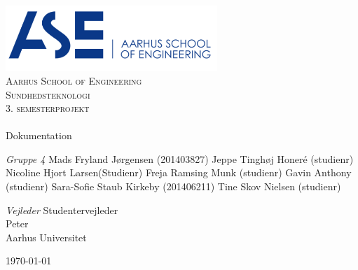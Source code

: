 \begin{titlingpage}
\begin{center}

~ \\[3cm]

\includegraphics[width=0.6\textwidth]{figurer/ASE}~\\[1cm]

\textsc{\LARGE Aarhus School of Engineering}\\[1.5cm]

\textsc{\Large Sundhedsteknologi}\\
\textsc{\Large 3. semesterprojekt}\\[0.5cm]

\noindent\makebox[\linewidth]{\rule{\textwidth}{0.4pt}}\\
[0.5cm]{\Huge Dokumentation}
\noindent\makebox[\linewidth]{\rule{\textwidth}{0.4pt}}

\end{center}

\textit{Gruppe 4} \newline
Mads Fryland J\o rgensen (201403827) \newline
Jeppe Tinghøj Honeré (studienr) \newline
Nicoline Hjort Larsen(Studienr) \newline
Freja Ramsing Munk (studienr) \newline		 
Gavin Anthony (studienr) \newline 
Sara-Sofie Staub Kirkeby (201406211) \newline
Tine Skov Nielsen (studienr) \newline



\textit{Vejleder} \newline
Studentervejleder\\
Peter\\
Aarhus Universitet


\vfill

\begin{center}
{\large \today}
\end{center}


\end{titlingpage}